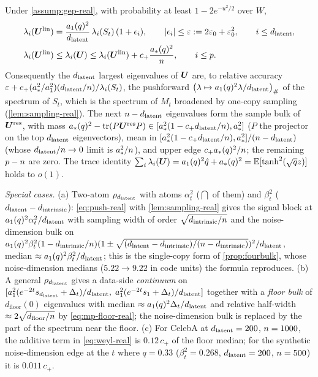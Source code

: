 \begin{proposition}\label{prop:pushforward-real}
Under \cref{assump:gep-real}, with probability at least $1-2e^{-u^2/2}$ over $W$,
\begin{align}
\lambda_i(\bm{U}^{\mathrm{lin}})&=\frac{a_1(q)^2}{d_{\mathrm{latent}}}\,\lambda_i(S_t)\,(1+\epsilon_i),\qquad |\epsilon_i|\le\varepsilon:=2\varepsilon_0+\varepsilon_0^2,\qquad i\le d_{\mathrm{latent}},\label{eq:push-real}\\
\lambda_i(\bm{U}^{\mathrm{lin}})&\le\lambda_i(\bm{U})\le\lambda_i(\bm{U}^{\mathrm{lin}})+c_+\frac{a_\ast(q)^2}{n},\qquad i\le p .\label{eq:weyl-real}
\end{align}
Consequently the $d_{\mathrm{latent}}$ largest eigenvalues of $\bm{U}$ are, to relative accuracy $\varepsilon+c_+(a_\ast^2/a_1^2)(d_{\mathrm{latent}}/n)/\lambda_i(S_t)$, the pushforward $\big(\lambda\mapsto a_1(q)^2\lambda/d_{\mathrm{latent}}\big)_\#$ of the spectrum of $S_t$, which is the spectrum of $M_t$ broadened by one-copy sampling (\cref{lem:sampling-real}). The next $n-d_{\mathrm{latent}}$ eigenvalues form the sample bulk of $\bm{U}^{\mathrm{res}}$, with mass $a_\ast(q)^2-\operatorname{tr}(P\bm{U}^{\mathrm{res}}P)\in[a_\ast^2(1-c_+d_{\mathrm{latent}}/n),a_\ast^2]$ ($P$ the projector on the top $d_{\mathrm{latent}}$ eigenvectors), mean in $[a_\ast^2(1-c_+d_{\mathrm{latent}}/n),a_\ast^2]/(n-d_{\mathrm{latent}})$ (whose $d_{\mathrm{latent}}/n\to0$ limit is $a_\ast^2/n$), and upper edge $c_+a_\ast(q)^2/n$; the remaining $p-n$ are zero. The trace identity $\sum_i\lambda_i(\bm{U})=a_1(q)^2\hat q+a_\ast(q)^2=\mathbb{E}[\tanh^2(\sqrt qz)]$ holds to $o(1)$.
\end{proposition}
\emph{Special cases.} (a) Two-atom $\rho_{d_{\mathrm{latent}}}$ with atoms $\alpha_t^2$ ($\dint$ of them) and $\beta_t^2$ ($d_{\mathrm{latent}}-d_{\mathrm{intrinsic}}$): \eqref{eq:push-real} with \cref{lem:sampling-real} gives the signal block at $a_1(q)^2\alpha_t^2/d_{\mathrm{latent}}$ with sampling width of order $\sqrt{d_{\mathrm{intrinsic}}/n}$ and the noise-dimension bulk on $a_1(q)^2\beta_t^2(1-d_{\mathrm{intrinsic}}/n)(1\pm\sqrt{(d_{\mathrm{latent}}-d_{\mathrm{intrinsic}})/(n-d_{\mathrm{intrinsic}})})^2/d_{\mathrm{latent}}$, median $\approx a_1(q)^2\beta_t^2/d_{\mathrm{latent}}$; this is the single-copy form of \cref{prop:fourbulk}, whose noise-dimension medians ($5.22\to9.22$ in code units) the formula reproduces. (b) A general $\rho_{d_{\mathrm{latent}}}$ gives a data-side \emph{continuum} on $[a_1^2(e^{-2t}s_{d_{\mathrm{latent}}}+\Delta_t)/d_{\mathrm{latent}},\;a_1^2(e^{-2t}s_1+\Delta_t)/d_{\mathrm{latent}}]$ together with a \emph{floor bulk} of $d_{\mathrm{floor}}(0)$ eigenvalues with median $\approx a_1(q)^2\Delta_t/d_{\mathrm{latent}}$ and relative half-width $\approx2\sqrt{d_{\mathrm{floor}}/n}$ by \eqref{eq:mp-floor-real}; the noise-dimension bulk is replaced by the part of the spectrum near the floor. (c) For CelebA at $d_{\mathrm{latent}}=200$, $n=1000$, the additive term in \eqref{eq:weyl-real} is $0.12\,c_+$ of the floor median; for the synthetic noise-dimension edge at the $t$ where $q=0.33$ ($\beta_t^2=0.268$, $d_{\mathrm{latent}}=200$, $n=500$) it is $0.011\,c_+$.
